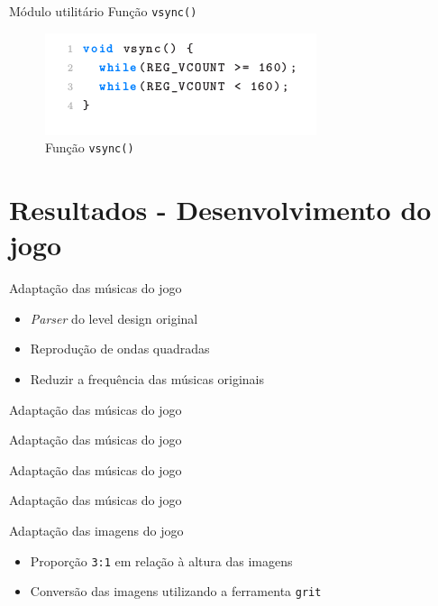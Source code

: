 \documentclass[notes, mathserif]{beamer}
\begin{document}
\begin{frame}{M\'odulo utilit\'ario}
	Fun\c c\~ao \texttt{vsync()}
	\begin{figure}[H]
		\includegraphics[width=.5\linewidth]{figuras/vsync.png}
		\centering
		\caption{Fun\c c\~ao \texttt{vsync()}}
		\label{fig:vsync}
	\end{figure}
\end{frame}

\section{Resultados - Desenvolvimento do jogo}

\begin{frame}{Adapta\c c\~ao das m\'usicas do jogo}
	\begin{itemize}[<+->]
		\item \textit{Parser} do level design original
		\item Reprodu\c c\~ao de ondas quadradas
		\item Reduzir a frequ\^encia das m\'usicas originais
	\end{itemize}
\end{frame}

\begin{frame}{Adapta\c c\~ao das m\'usicas do jogo}
\end{frame}

\begin{frame}{Adapta\c c\~ao das m\'usicas do jogo}
\end{frame}

\begin{frame}{Adapta\c c\~ao das m\'usicas do jogo}
\end{frame}

\begin{frame}{Adapta\c c\~ao das m\'usicas do jogo}
\end{frame}

\begin{frame}{Adapta\c c\~ao das imagens do jogo}
	\begin{itemize}[<+->]
		\item Propor\c c\~ao \texttt{3:1} em rela\c c\~ao \`a altura das imagens
		\item Convers\~ao das imagens utilizando a ferramenta \texttt{grit}
	\end{itemize}
\end{frame}
\end{document}
